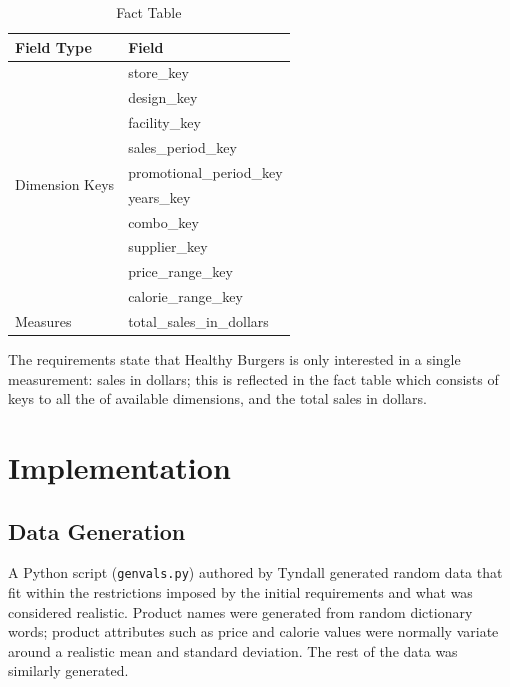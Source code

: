 \documentclass[11pt, a4paper]{article}
\begin{document}
\begin{table}
\begin{minipage}{0.6\textwidth}
\end{minipage}
\begin{minipage}{0.45\textwidth}
\begin{tabular}{| p{} | p{} |}
	\hline
	\textbf{Field Type} & \textbf{Field} \\
	\hline	
	\multirow{10}{.25\textwidth}{Dimension Keys} & store\_key \\
		& design\_key \\ 
		& facility\_key \\
		& sales\_period\_key \\
		& promotional\_period\_key \\
		& years\_key \\
		& combo\_key \\
		& supplier\_key \\
		& price\_range\_key \\
		& calorie\_range\_key \\
	\hline	

	Measures & total\_sales\_in\_dollars \\
	\hline

	\end{tabular}
	\caption{Fact Table}
	\label{tab:facts}
\end{minipage}
\end{table}

The requirements state that Healthy Burgers is only interested in a single measurement: sales in dollars; this is reflected in the fact table which consists of keys to all the of available dimensions, and the total sales in dollars.

\section*{Implementation}

\subsection*{Data Generation}

A Python script (\texttt{genvals.py}) authored by Tyndall generated random data that fit within the restrictions imposed by the initial requirements and what was considered realistic. Product names were generated from random dictionary words; product attributes such as price and calorie values were normally variate around a realistic mean and standard deviation. The rest of the data was similarly generated.
\end{document}
